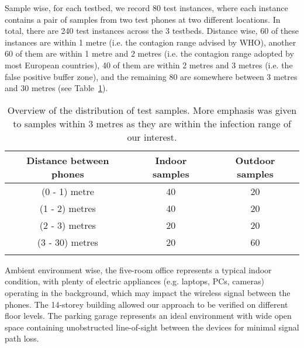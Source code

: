 \documentclass[graybox]{svmult}
\begin{document}
Sample wise, for each testbed, we record 80 test instances, where each instance contains a pair of samples from two test phones at two different locations. In total, there are 240 test instances across the 3 testbeds. Distance wise, 60 of these instances are within 1 metre (i.e. the contagion range advised by WHO), another 60 of them are within 1 metre and 2 metres (i.e. the contagion range adopted by most European countries), 40 of them are within 2 metres and 3 metres (i.e. the false positive buffer zone), and the remaining 80 are somewhere between 3 metres and 30 metres (see Table~\ref{sampledistribution}).
\begin{table}[h]
	\caption{Overview of the distribution of test samples. More emphasis was given to samples within 3 metres as they are within the infection range of our interest.}
	\centering
	\begin{tabular}{c c c}
		\toprule
		\textbf{Distance between phones} & \textbf{Indoor samples} & \textbf{Outdoor samples} \\
		\midrule
		(0 - 1) metre & 40 & 20 \\ \addlinespace[0.2cm]
		(1 - 2) metres & 40 & 20 \\ \addlinespace[0.2cm]
		(2 - 3) metres & 20 & 20 \\ \addlinespace[0.2cm]
		(3 - 30) metres & 20 & 60 \\ \addlinespace[0.2cm]
		\bottomrule
	\end{tabular}
	\label{sampledistribution}
\end{table}

Ambient environment wise, the five-room office represents a typical indoor condition, with plenty of electric appliances (e.g. laptops, PCs, cameras) operating in the background, which may impact the wireless signal between the phones. The 14-storey building allowed our approach to be verified on different floor levels. The parking garage represents an ideal environment with wide open space containing unobstructed line-of-sight between the devices for minimal signal path loss. 

\end{document}
